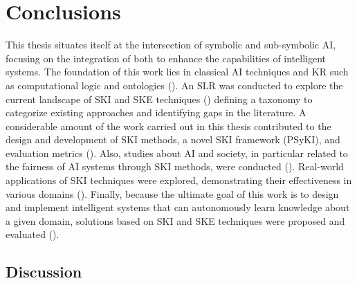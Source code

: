 
\chapter{Conclusions}
\label{ch:conclusions}
\minitoc

This thesis situates itself at the intersection of symbolic and sub-symbolic \gls{AI}, focusing on the integration of both to enhance the capabilities of intelligent systems.
%
The foundation of this work lies in classical \gls{AI} techniques and \gls{KR} such as computational logic and ontologies ().
%
An \gls{SLR} was conducted to explore the current landscape of \gls{SKI} and \gls{SKE} techniques () defining a taxonomy to categorize existing approaches and identifying gaps in the literature.
%
A considerable amount of the work carried out in this thesis contributed to the design and development of \gls{SKI} methods, a novel \gls{SKI} framework (\gls{PSyKI}), and evaluation metrics ().
%
Also, studies about \gls{AI} and society, in particular related to the fairness of \gls{AI} systems through \gls{SKI} methods, were conducted ().
%
Real-world applications of \gls{SKI} techniques were explored, demonstrating their effectiveness in various domains ().
%
Finally, because the ultimate goal of this work is to design and implement intelligent systems that can autonomously learn knowledge about a given domain, solutions based on \gls{SKI} and \gls{SKE} techniques were proposed and evaluated ().


\section{Discussion}\label{sec:discussion}

